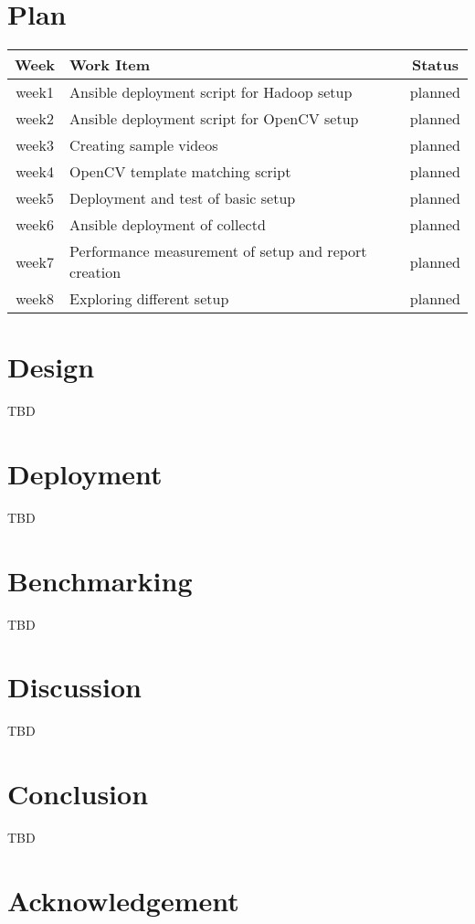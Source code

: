\documentclass[9pt,twocolumn,twoside]{styles/osajnl}
\begin{document}
\section{Plan}
\begin{center}
\begin{tabular}{ |c|l|c| }
 \hline
Week & Work Item & Status \\
\hline
week1 & Ansible deployment script for Hadoop setup  & planned \\
week2 & Ansible deployment script for OpenCV setup  & planned \\
week3 & Creating sample videos & planned \\
week4 & OpenCV template matching script & planned \\
week5 & Deployment and test of basic setup & planned \\
week6 & Ansible deployment of collectd & planned \\
week7 & Performance measurement of setup and report creation  & planned \\
week8 & Exploring different setup & planned \\
 \hline
\end{tabular}
\end{center}


\section{Design}
TBD

\section{Deployment}
TBD
\section{Benchmarking}
TBD

\section{Discussion}
TBD

\section{Conclusion}

TBD

\section{Acknowledgement}





 
\end{document}
